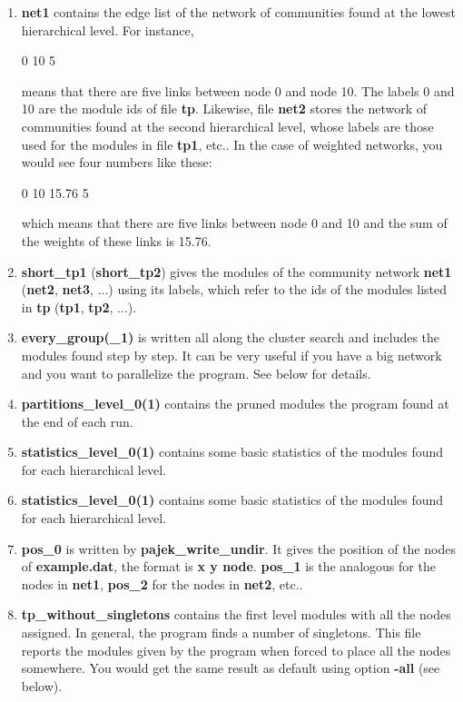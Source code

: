 \documentclass[11pt]{article}
\begin{document}
\begin{enumerate}
  \item \textbf{net1} contains the edge list of the network of
    communities found at the lowest hierarchical level. For instance,
  
0	10	5

  
  means that there are five links between node 0 and node 10. The
  labels 0 and 10
  are the module ids of file \textbf{tp}. 
Likewise, file  \textbf{net2} stores the network of communities found
at the second hierarchical level, whose labels are those used
for the modules in file \textbf{tp1}, etc.. In the case of weighted networks, you would see four numbers like these:
  
 0 10 15.76 5
 
which means that there are five links between node 0 and 10 and the sum of the weights of these links is 15.76.
     
  
  \item  \textbf{short\_tp1} ({\bf short\_tp2}) gives the modules of
    the community
    network \textbf{net1} ({\bf net2}, {\bf net3}, ...) using its
    labels, which refer to the ids of the modules listed in
    \textbf{tp} ({\bf tp1}, {\bf tp2}, ...).
   
  \item \textbf{every\_group(\_1)} is written all along the cluster
    search and includes the modules found step by step. 
It can be very useful if you have a big network and you want to parallelize the program. See below for details.
  
  
  \item \textbf{partitions\_level\_0(1)}  contains the pruned modules the program found at the end of each run. 
  
  \item \textbf{statistics\_level\_0(1)}  contains some basic statistics of the modules found for each hierarchical level.

  \item \textbf{statistics\_level\_0(1)}  contains some basic statistics of the modules found for each hierarchical level.


  
  \item \textbf{pos\_0} is written by \textbf{pajek\_write\_undir}. It
    gives the position of the nodes of \textbf{example.dat}, the
    format is \textbf{x y node}. \textbf{pos\_1} is the analogous for the
    nodes in \textbf{net1}, \textbf{pos\_2} for the nodes in
    \textbf{net2}, etc..
  
  \item \textbf{tp\_without\_singletons}  contains the first level modules with all the nodes assigned. In general, the program finds a number of singletons. This file reports the modules given by the program when forced to place all the nodes somewhere. You would get the same result as default using option \textbf{-all} (see below).
  
\end{enumerate}
\end{document}
